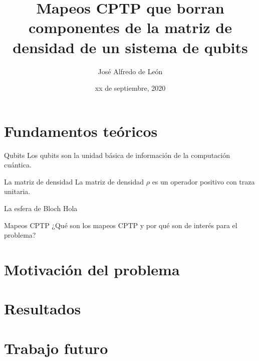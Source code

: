\documentclass[11pt]{beamer}
\title[Mapeos que borran componentes de $\rho$]{Mapeos CPTP que
borran componentes de la matriz de densidad de un sistema de 
qubits}
\author[J. A. de León]{José Alfredo de León}
\institute[ECFM-USAC]{Escuela de Ciencias Físicas y Matemáticas, USAC}
\date[xx.09.2020]{xx de septiembre, 2020}
\begin{document}
\begin{frame}
\titlepage
\end{frame}


\section{Fundamentos teóricos}
\begin{frame}{Qubits}
Los qubits son la unidad básica de información de la computación cuántica.
\end{frame}

\begin{frame}{La matriz de densidad}
La matriz de densidad $\rho$ es un operador positivo con traza unitaria. 
\end{frame}

\begin{frame}{La esfera de Bloch}
Hola
\end{frame}

\begin{frame}{Mapeos CPTP}
¿Qué son los mapeos CPTP y por qué son de interés para el problema?
\end{frame}


\section{Motivación del problema}


\section{Resultados}


\section{Trabajo futuro}
\end{document}
